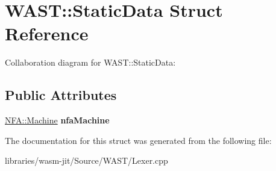 \hypertarget{struct_w_a_s_t_1_1_static_data}{}\section{W\+A\+ST\+:\+:Static\+Data Struct Reference}
\label{struct_w_a_s_t_1_1_static_data}


Collaboration diagram for W\+A\+ST\+:\+:Static\+Data\+:
\subsection*{Public Attributes}
\begin{DoxyCompactItemize}
\item 
\mbox{\label{struct_w_a_s_t_1_1_static_data_a37c4d27bb956914c06b3198191995f35}} 
\mbox{\hyperlink{struct_n_f_a_1_1_machine}{N\+F\+A\+::\+Machine}} {\bfseries nfa\+Machine}
\end{DoxyCompactItemize}


The documentation for this struct was generated from the following file\+:\begin{DoxyCompactItemize}
\item 
libraries/wasm-\/jit/\+Source/\+W\+A\+S\+T/Lexer.\+cpp\end{DoxyCompactItemize}
